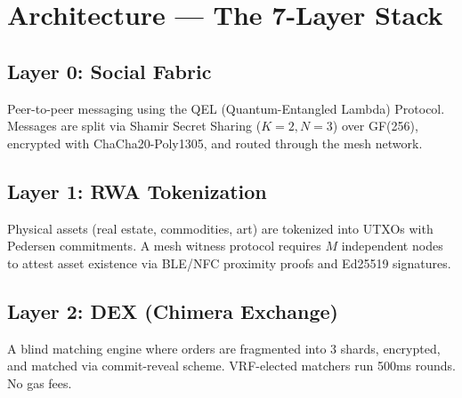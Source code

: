 \documentclass[11pt,a4paper]{article}
\begin{document}
\section{Architecture --- The 7-Layer Stack}

\begin{center}
\end{center}

\subsection{Layer 0: Social Fabric}
Peer-to-peer messaging using the QEL (Quantum-Entangled Lambda) Protocol. Messages are split via Shamir Secret Sharing ($K=2, N=3$) over GF(256), encrypted with ChaCha20-Poly1305, and routed through the mesh network.

\subsection{Layer 1: RWA Tokenization}
Physical assets (real estate, commodities, art) are tokenized into UTXOs with Pedersen commitments. A mesh witness protocol requires $M$ independent nodes to attest asset existence via BLE/NFC proximity proofs and Ed25519 signatures.

\subsection{Layer 2: DEX (Chimera Exchange)}
A blind matching engine where orders are fragmented into 3 shards, encrypted, and matched via commit-reveal scheme. VRF-elected matchers run 500ms rounds. No gas fees.
\end{document}
